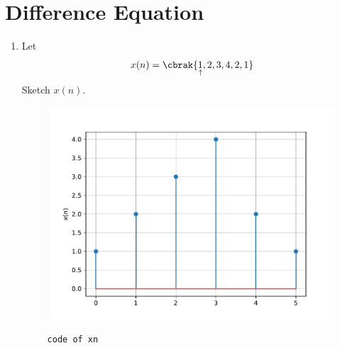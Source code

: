 \documentclass[journal,12pt,twocolumn]{IEEEtran}
\renewcommand\thesection{\arabic{section}}
\begin{document}
\section{Difference Equation}
\begin{enumerate}[label=\thesection.\arabic*,ref=\thesection.\theenumi]
\item Let
\begin{equation}
x(n) = \cbrak{\underset{\uparrow}{1},2,3,4,2,1}
\end{equation}
Sketch $x(n)$. \\
\solution 

\begin{figure}[!ht]
\begin{center}
\includegraphics[width=\columnwidth]{figs/q3/xn.pdf}
\end{center}
\label{fig:xn}	
\end{figure}
\begin{lstlisting}
     code of xn
\end{lstlisting}


\end{enumerate}
\end{document}
